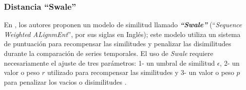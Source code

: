 \subsubsection{\textbf{Distancia \enquote{Swale}}}
En \cite{swale}, los autores proponen un modelo de similitud llamado \textbf{\textit{\enquote{Swale}}} (\enquote{\textit{Sequence Weighted ALignmEnt}}, por sus siglas en Ingl\'es); este modelo utiliza un sistema de puntuaci\'on para recompensar las similitudes y penalizar las disimilitudes durante la comparaci\'on de series temporales. El uso de \textit{Swale} requiere necesariamente el ajuste de tres par\'ametros: 1- un umbral de similitud \textbf{$\epsilon$}, 2- un valor o peso $r$ utilizado para recompensar las similitudes y 3- un valor o peso $p$ para penalizar los vacios o disimilitudes \cite{swale}.


















